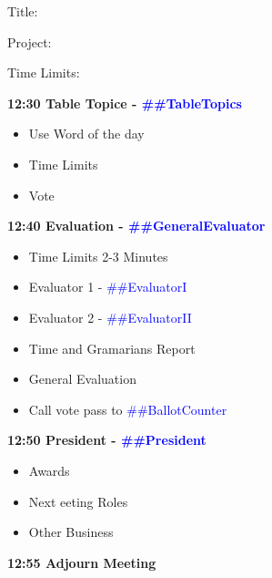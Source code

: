 \documentclass{article}
\newcommand{\president}{##President}
\newcommand{\tableTopics}{##TableTopics}
\newcommand{\generalEvaluator}{##GeneralEvaluator}
\newcommand{\evaluatorI}{##EvaluatorI}
\newcommand{\evaluatorII}{##EvaluatorII}
\newcommand{\ballotCounter}{##BallotCounter}
\begin{document}
\begin{spacing}{.8}
\begin{itemize}
\begin{description}
          \item{Title:}
          \item{Project:}
          \item{Time Limits:}
      \end{description}
  \end{itemize}
  {\Large \bf12:30 Table Topice - \textcolor{blue}{\tableTopics{}}} 
  \begin{itemize}
   \item Use Word of the day
   \item Time Limits
   \item Vote
  \end{itemize}
  {\Large \bf12:40 Evaluation - \textcolor{blue}{\generalEvaluator{}}} 
  \begin{itemize}
    \item Time Limits 2-3 Minutes
    \item Evaluator 1 - \textcolor{blue}{\evaluatorI{}}
    \item Evaluator 2 - \textcolor{blue}{\evaluatorII{}}
	\item Time and Gramarians Report
	\item General Evaluation
    \item Call vote pass to \textcolor{blue}{\ballotCounter{}}
  \end{itemize}
  {\Large \bf12:50 President - \textcolor{blue}{\president{}}} 
  \begin{itemize}
    \item Awards
    \item Next eeting Roles
    \item Other Business
  \end{itemize}
  {\Large \bf12:55 Adjourn Meeting} 
  \end{spacing}
  
\end{document}
